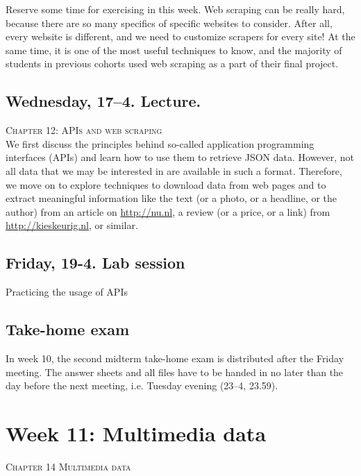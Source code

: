 Reserve some time for exercising in this week. Web scraping can be really hard, because there are so many specifics of specific websites to consider. After all, every website is different, and we need to customize scrapers for every site! At the same time, it is one of the most useful techniques to know, and the majority of students in previous cohorts used web scraping as a part of their final project.

\subsection*{Wednesday, 17--4. Lecture.}
\textsc{ Chapter 12: APIs and web scraping}\\

We first discuss the principles behind so-called application programming interfaces (APIs) and learn how to use them to retrieve JSON data. However, not all data that we may be interested in are available in such a format. Therefore, we move on to explore techniques to download data from web pages and to extract meaningful information like the text (or a photo, or a headline, or the author) from an article on \url{http://nu.nl}, a review (or a price, or a link) from \url{http://kieskeurig.nl}, or similar.



\subsection*{Friday, 19-4. Lab session}

Practicing the usage of APIs

\subsection*{Take-home exam}
In week 10, the second midterm take-home exam is distributed after the Friday meeting. The answer sheets and all files have to be handed in no later than the day before the next meeting, i.e. Tuesday evening (23--4, 23.59).






\section*{Week 11: Multimedia data}
\textsc{ Chapter 14 Multimedia data}\\

